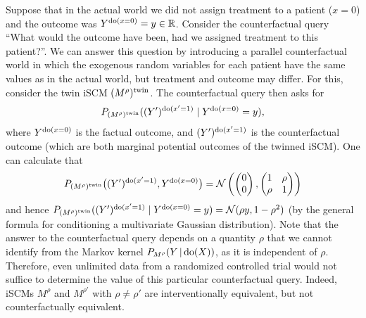 \begin{Eg}
Suppose that in the actual world we did not assign treatment to a patient ($x=0$) and the outcome was $Y^{\operatorname{do}(x=0)}=y \in\mathbb{R}$.
Consider the counterfactual query ``What would the outcome have been, had we assigned treatment to this patient?''. 
We can answer this question by introducing a parallel counterfactual world in which the exogenous random variables for each
patient have the same values as in the actual world, but treatment and outcome may differ. For this, consider the
twin iSCM $(M^{\rho})^{\mathrm{twin}}$.
The counterfactual query then asks for 
  $$P_{(M^{\rho})^{\mathrm{twin}}}((Y')^{\operatorname{do}(x'=1)}\mid Y^{\operatorname{do}(x=0)}=y),$$
where $Y^{\operatorname{do}(x=0)}$ is the factual outcome, and $(Y')^{\operatorname{do}(x'=1)}$ is the counterfactual outcome (which are both marginal potential outcomes of the twinned iSCM). One can calculate that
$$
  P_{(M^{\rho})^{\mathrm{twin}}}\big((Y')^{\operatorname{do}(x'=1)},Y^{\operatorname{do}(x=0)}\big) = \mathcal{N}\left(\begin{pmatrix}0\\ 0\end{pmatrix}, \begin{pmatrix} 1 & \rho \\ \rho & 1 \end{pmatrix}\right)
$$
and hence $P_{(M^{\rho})^{\mathrm{twin}}}((Y')^{\operatorname{do}(x'=1)} \mid Y^{\operatorname{do}(x=0)}=y) = \mathcal{N}(\rho y,1-\rho^2)$ (by the general formula for conditioning a multivariate Gaussian distribution). Note that the answer to the counterfactual query depends on a quantity $\rho$ that we cannot identify from the Markov kernel $P_{M^{\rho}}(Y\operatorname*{|} \operatorname{do} (X))$, as it is independent of $\rho$. Therefore, even unlimited data from a randomized controlled trial would not suffice to determine the value of this particular counterfactual query.
Indeed, iSCMs $M^{\rho}$ and $M^{\rho'}$ with $\rho\neq\rho'$ are interventionally equivalent, but not counterfactually equivalent.
\end{Eg}
